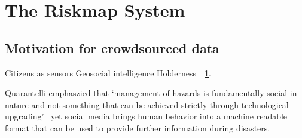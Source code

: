 \section{The Riskmap System}\label{ch1:riskmap}


\subsection{Motivation for crowdsourced data} Citizens as sensors Geosocial
intelligence
Holderness~\cite{holdernessSocialMediaGeoSocial2015a}~\ref{ch1:riskmap}.

Quarantelli emphaszied that  `management of hazards is fundamentally social in
nature and not something that can be achieved strictly through technological
upgrading'~\cite{tierneyFacingUnexpectedDisaster2001} yet social media brings
human behavior into a machine readable format that can be used to provide
further information during disasters.


\subsection{}

